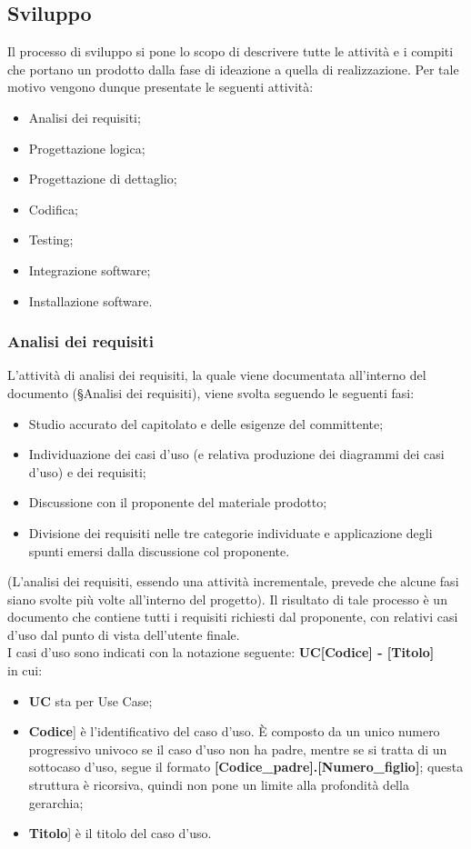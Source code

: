 \documentclass[10pt, a4paper]{article}
\begin{document}
\subsection{Sviluppo}
Il processo di sviluppo si pone lo scopo di descrivere tutte le attività e i compiti che portano un prodotto dalla fase di ideazione a quella di realizzazione. 
Per tale motivo vengono dunque presentate le seguenti attività:
\begin{itemize}
    \item Analisi dei requisiti;
    \item Progettazione logica;
    \item Progettazione di dettaglio;
    \item Codifica;
    \item Testing;
    \item Integrazione software;
    \item Installazione software.
\end{itemize}

\subsubsection{Analisi dei requisiti}
L'attività di analisi dei requisiti, la quale viene documentata all'interno del documento (\S Analisi dei requisiti), viene svolta seguendo le seguenti fasi:
\begin{itemize}
    \item Studio accurato del capitolato e delle esigenze del committente;
    \item Individuazione dei casi d'uso (e relativa produzione dei diagrammi dei casi d'uso) e dei requisiti;
    \item Discussione con il proponente del materiale prodotto;
    \item Divisione dei requisiti nelle tre categorie individuate e applicazione degli spunti emersi dalla discussione col proponente.
\end{itemize}
(L'analisi dei requisiti, essendo una attività incrementale, prevede che alcune fasi siano svolte più volte all'interno del progetto).
Il risultato di tale processo è un documento che contiene tutti i requisiti richiesti dal proponente, con relativi casi d'uso dal punto di vista dell'utente finale.\\

I casi d'uso sono indicati con la notazione seguente: \textbf{UC[Codice] - [Titolo]}\\
in cui:
\begin{itemize}
\item \textbf{UC} sta per Use Case;
\item \lbrack \textbf{Codice}] è l'identificativo del caso d'uso. È composto da un unico numero progressivo univoco se il caso d'uso non ha padre, mentre se si tratta di un sottocaso d'uso, segue il formato \textbf{[Codice\_padre].[Numero\_figlio]}; questa struttura è ricorsiva, quindi non pone un limite alla profondità della gerarchia;
\item \lbrack \textbf{Titolo}] è il titolo del caso d'uso.
\end{itemize}
\end{document}
